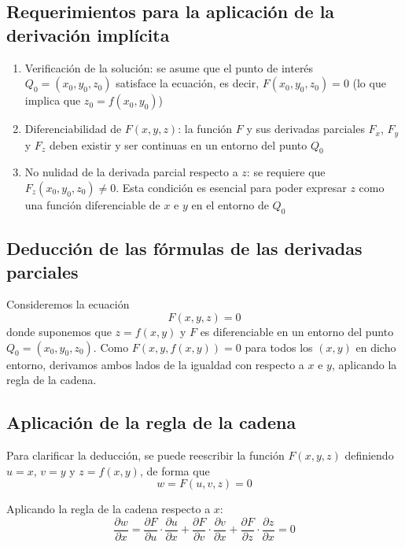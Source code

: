 \documentclass{article}
\begin{document}
\subsection*{Requerimientos para la aplicación de la derivación implícita}
\begin{enumerate}
    \item {\color{teal}Verificación de la solución:} se asume que el punto de interés \( Q_0 = (x_0, y_0, z_0) \) satisface la ecuación, es decir, \( F(x_0, y_0, z_0) = 0 \) (lo que implica que \( z_0 = f(x_0, y_0) \))
    \item {\color{teal}Diferenciabilidad de \( F(x,y,z) \):} la función \( F \) y sus derivadas parciales \( F_x \), \( F_y \) y \( F_z \) deben existir y ser continuas en un entorno del punto \( Q_0 \)
    \item {\color{teal}No nulidad de la derivada parcial respecto a \( z \):} se requiere que \( F_z(x_0, y_0, z_0) \neq 0 \). Esta condición es esencial para poder expresar \( z \) como una función diferenciable de \( x \) e \( y \) en el entorno de \( Q_0 \)
\end{enumerate}

\subsection*{Deducción de las fórmulas de las derivadas parciales}

Consideremos la ecuación
\[
F(x,y,z) = 0
\]
donde suponemos que \( z = f(x,y) \) y \( F \) es diferenciable en un entorno del punto \( Q_0 = (x_0, y_0, z_0) \). Como \( F(x,y,f(x,y)) = 0 \) para todos los \( (x,y) \) en dicho entorno, derivamos ambos lados de la igualdad con respecto a \( x \) e \( y \), aplicando la regla de la cadena.

\subsection*{Aplicación de la regla de la cadena}

Para clarificar la deducción, se puede reescribir la función \( F(x,y,z) \) definiendo \( u = x \), \( v = y \) y \( z = f(x,y) \), de forma que
\[
w = F(u,v,z) = 0
\]

Aplicando la regla de la cadena respecto a \( x \):
\[
\frac{\partial w}{\partial x} = \frac{\partial F}{\partial u} \cdot \frac{\partial u}{\partial x} + \frac{\partial F}{\partial v} \cdot \frac{\partial v}{\partial x} + \frac{\partial F}{\partial z} \cdot \frac{\partial z}{\partial x} = 0
\]
\end{document}
